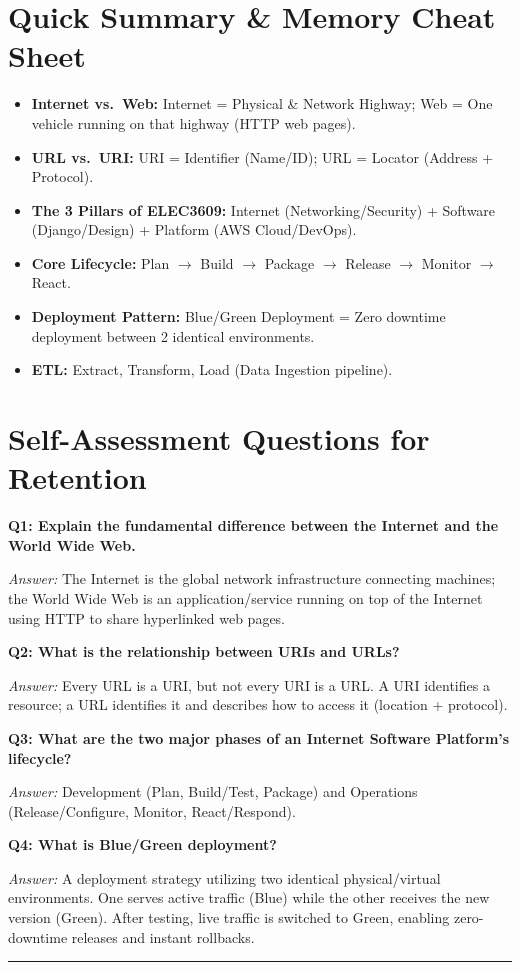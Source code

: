 \documentclass[8pt, a4paper]{article}
\begin{document}
\section{Quick Summary \& Memory Cheat Sheet}

\begin{itemize}
  \item \textbf{Internet vs.\ Web:} Internet = Physical \& Network Highway; Web = One vehicle running on that highway (HTTP web pages).
  \item \textbf{URL vs.\ URI:} URI = Identifier (Name/ID); URL = Locator (Address + Protocol).
  \item \textbf{The 3 Pillars of ELEC3609:} Internet (Networking/Security) + Software (Django/Design) + Platform (AWS Cloud/DevOps).
  \item \textbf{Core Lifecycle:} Plan $\to$ Build $\to$ Package $\to$ Release $\to$ Monitor $\to$ React.
  \item \textbf{Deployment Pattern:} Blue/Green Deployment = Zero downtime deployment between 2 identical environments.
  \item \textbf{ETL:} Extract, Transform, Load (Data Ingestion pipeline).
\end{itemize}

\section{Self-Assessment Questions for Retention}

\textbf{Q1: Explain the fundamental difference between the Internet and the World Wide Web.}

\smallskip
\textit{Answer:} The Internet is the global network infrastructure connecting machines; the World Wide Web is an application/service running on top of the Internet using HTTP to share hyperlinked web pages.

\bigskip

\textbf{Q2: What is the relationship between URIs and URLs?}

\smallskip
\textit{Answer:} Every URL is a URI, but not every URI is a URL. A URI identifies a resource; a URL identifies it and describes how to access it (location + protocol).

\bigskip

\textbf{Q3: What are the two major phases of an Internet Software Platform's lifecycle?}

\smallskip
\textit{Answer:} Development (Plan, Build/Test, Package) and Operations (Release/Configure, Monitor, React/Respond).

\bigskip

\textbf{Q4: What is Blue/Green deployment?}

\smallskip
\textit{Answer:} A deployment strategy utilizing two identical physical/virtual environments. One serves active traffic (Blue) while the other receives the new version (Green). After testing, live traffic is switched to Green, enabling zero-downtime releases and instant rollbacks.

\vspace{14pt}
\textcolor{rulegray}{\rule{\linewidth}{1pt}}
\end{document}
